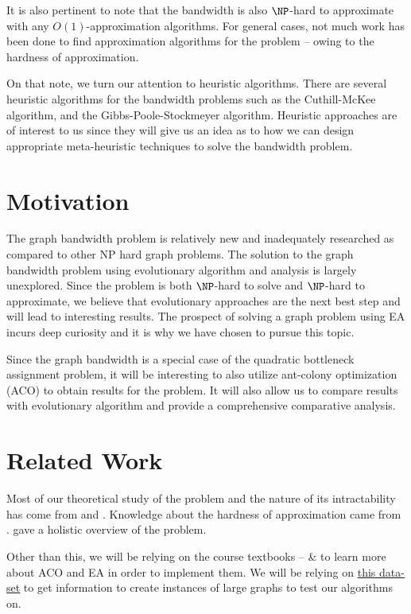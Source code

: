 \documentclass[a4paper,11pt]{article}
\begin{document}
It is also pertinent to note that the bandwidth is also $\NP$-hard to approximate with any 
$O(1)$-approximation algorithms. For general cases, not much work has been done to find 
approximation algorithms for the problem -- owing to the hardness of approximation. 

On that note, we turn our attention to heuristic algorithms. There are several heuristic 
algorithms for the bandwidth problems such as the Cuthill-McKee algorithm, and the 
Gibbs-Poole-Stockmeyer algorithm. Heuristic approaches are of interest to us since they will give us an idea as to how we can design appropriate meta-heuristic techniques to solve 
the bandwidth problem. 

\section{Motivation}
The graph bandwidth problem is relatively new and inadequately researched as compared to other NP hard graph problems. The solution to the graph bandwidth problem using evolutionary algorithm and analysis is largely unexplored. Since the problem is both $\NP$-hard to solve and $\NP$-hard to approximate, we believe that evolutionary
approaches are the next best step and will lead to interesting results. 
The prospect of solving a graph problem using EA incurs deep curiosity and it is why we have chosen to pursue this topic.

Since the graph bandwidth is a special case of the quadratic bottleneck assignment problem, it will be interesting to also utilize ant-colony optimization (ACO) to obtain results for the problem. It will also allow us to compare results with evolutionary algorithm and provide a comprehensive comparative analysis.

\section{Related Work}
Most of our theoretical study of the problem and the nature of its intractability has come from \cite{ccdg1982} and \cite{garey_johnson_2003}. 
Knowledge about the hardness of approximation came from \cite{743431}.  \cite{beineke_wilson_1983} gave a holistic overview of the problem. 

Other than this, we will be relying on the course textbooks -- \cite{nunes_2023} \& \cite{engelbrecht_computational_2007} to learn more about ACO and EA in order to implement them. We will be relying on \href{http://people.brunel.ac.uk/~mastjjb/jeb/orlib/}{this data-set} to get
information to create instances of large graphs to test our algorithms on. 
\end{document}
